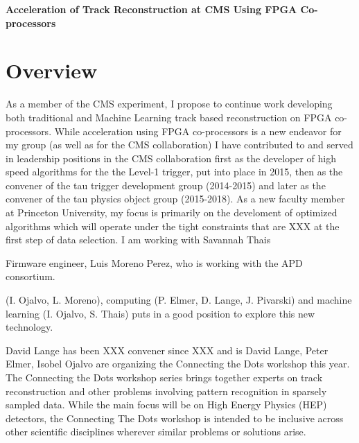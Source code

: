 \documentclass[preprint,12pt]{elsarticle}
\begin{document}





\noindent
\textbf{Acceleration of Track Reconstruction at CMS Using FPGA Co-processors}

\section{Overview}
\label{S:1}
As a member of the CMS experiment, I propose to continue work developing both
traditional and Machine Learning track based reconstruction on FPGA co-processors.
While acceleration using FPGA co-processors is a new endeavor for my group 
(as well as for the CMS collaboration) I have contributed to and served 
in leadership positions in the CMS collaboration first as the developer of
high speed algorithms for the the Level-1 trigger, put into place in 2015,
then as the convener of the tau trigger development group (2014-2015) 
and later as the convener of the tau physics object group (2015-2018).
As a new faculty member at Princeton University, my focus is primarily
on the develoment of optimized algorithms which will operate under the
tight constraints that are XXX at the first step of data selection.
I am working with Savannah Thais

Firmware engineer, Luis Moreno Perez, who is working with
the APD consortium.

 (I. Ojalvo, L. Moreno),
computing (P. Elmer, D. Lange, J. Pivarski) and machine learning (I. Ojalvo, S. Thais)
puts in a good position to explore this new technology.

David Lange has been XXX convener since XXX and is 
David Lange, Peter Elmer, Isobel Ojalvo are organizing the Connecting the Dots
workshop this year. The Connecting the Dots workshop series brings together 
experts on track reconstruction and other problems involving pattern recognition 
in sparsely sampled data. While the main focus will be on High Energy Physics (HEP) 
detectors, the Connecting The Dots workshop is intended to be inclusive across other
scientific disciplines wherever similar problems or solutions arise. 
\end{document}
